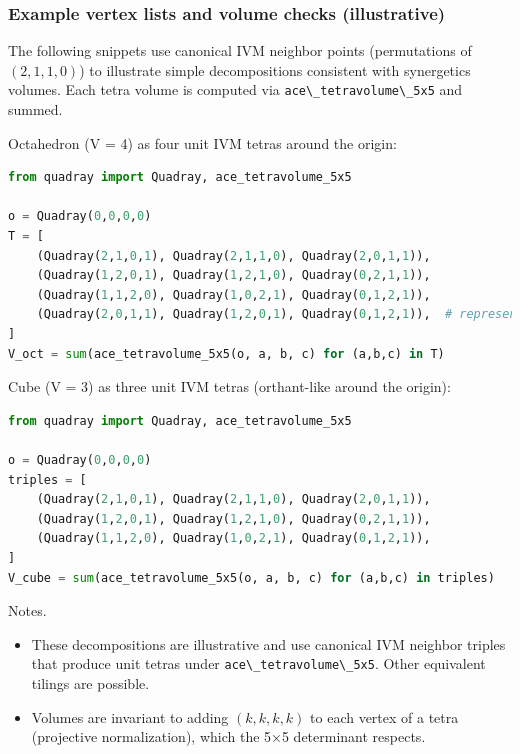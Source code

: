 \documentclass[
  10pt,
]{article}
\newcommand{\passthrough}[1]{#1}
\providecommand{\tightlist}{%
  \setlength{\itemsep}{0pt}\setlength{\parskip}{0pt}}
\begin{document}
\hypertarget{example-vertex-lists-and-volume-checks-illustrative}{%
\subsubsection{Example vertex lists and volume checks
(illustrative)}\label{example-vertex-lists-and-volume-checks-illustrative}}

The following snippets use canonical IVM neighbor points (permutations
of \((2,1,1,0)\)) to illustrate simple decompositions consistent with
synergetics volumes. Each tetra volume is computed via
\passthrough{\lstinline!ace\_tetravolume\_5x5!} and summed.

Octahedron (V = 4) as four unit IVM tetras around the origin:

\begin{lstlisting}[language=Python]
from quadray import Quadray, ace_tetravolume_5x5

o = Quadray(0,0,0,0)
T = [
    (Quadray(2,1,0,1), Quadray(2,1,1,0), Quadray(2,0,1,1)),
    (Quadray(1,2,0,1), Quadray(1,2,1,0), Quadray(0,2,1,1)),
    (Quadray(1,1,2,0), Quadray(1,0,2,1), Quadray(0,1,2,1)),
    (Quadray(2,0,1,1), Quadray(1,2,0,1), Quadray(0,1,2,1)),  # representative variant
]
V_oct = sum(ace_tetravolume_5x5(o, a, b, c) for (a,b,c) in T)
\end{lstlisting}

Cube (V = 3) as three unit IVM tetras (orthant-like around the origin):

\begin{lstlisting}[language=Python]
from quadray import Quadray, ace_tetravolume_5x5

o = Quadray(0,0,0,0)
triples = [
    (Quadray(2,1,0,1), Quadray(2,1,1,0), Quadray(2,0,1,1)),
    (Quadray(1,2,0,1), Quadray(1,2,1,0), Quadray(0,2,1,1)),
    (Quadray(1,1,2,0), Quadray(1,0,2,1), Quadray(0,1,2,1)),
]
V_cube = sum(ace_tetravolume_5x5(o, a, b, c) for (a,b,c) in triples)
\end{lstlisting}

Notes.

\begin{itemize}
\tightlist
\item
  These decompositions are illustrative and use canonical IVM neighbor
  triples that produce unit tetras under
  \passthrough{\lstinline!ace\_tetravolume\_5x5!}. Other equivalent
  tilings are possible.
\item
  Volumes are invariant to adding \((k,k,k,k)\) to each vertex of a
  tetra (projective normalization), which the 5×5 determinant respects.
\end{itemize}
\end{document}

